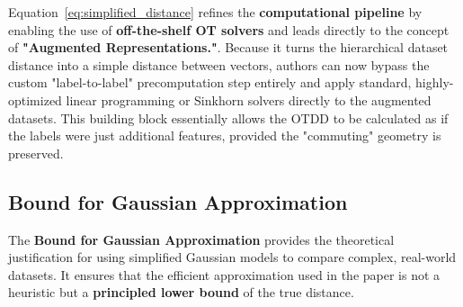 \documentclass[11pt, a4paper]{article}
\theoremstyle{plain} %
\theoremstyle{definition} %
\begin{document}
			Equation~\ref{eq:simplified_distance} refines the \textbf{computational pipeline} by enabling the use of \textbf{off-the-shelf OT solvers} and leads directly to the concept of \textbf{"Augmented Representations."}. Because it turns the hierarchical dataset distance into a simple distance between vectors, authors can now bypass the custom "label-to-label" precomputation step entirely and apply standard, highly-optimized linear programming or Sinkhorn solvers directly to the augmented datasets. This building block essentially allows the OTDD to be calculated as if the labels were just additional features, provided the "commuting" geometry is preserved.


		\subsection{Bound for Gaussian Approximation}
		\label{sec:bound}
			The \textbf{Bound for Gaussian Approximation} provides the theoretical justification for using simplified Gaussian models to compare complex, real-world datasets. It ensures that the efficient approximation used in the paper is not a heuristic but a \textbf{principled lower bound} of the true distance.
\end{document}

